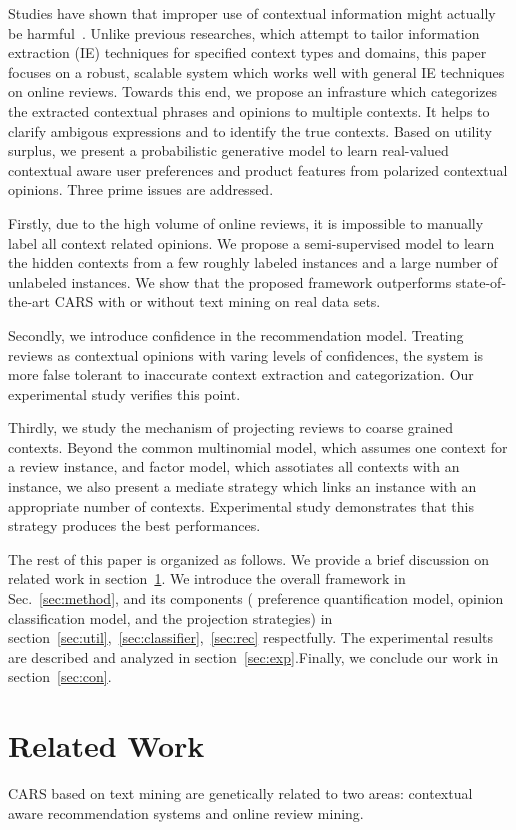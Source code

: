\documentclass[preprint,12pt]{elsarticle}
\begin{document}
Studies have shown that improper use of contextual information might actually be harmful~\cite{Li2010Contextual}. Unlike previous researches, which attempt to tailor information extraction (IE) techniques for specified context types and domains, this paper focuses on a robust, scalable system which works well with general IE techniques on online reviews. Towards this end, we propose an infrasture which categorizes the extracted contextual phrases and opinions to multiple contexts. It helps to clarify ambigous expressions and to identify the true contexts. Based on utility surplus, we present a probabilistic generative model to learn real-valued contextual aware user preferences and product features from polarized contextual opinions. Three prime issues are addressed. 

Firstly, due to the high volume of online reviews, it is impossible to manually label all context related opinions. We propose a semi-supervised model to learn the hidden contexts from a few roughly labeled instances and a large number of unlabeled instances. We show that the proposed framework outperforms state-of-the-art CARS with or without text mining on real data sets.    

Secondly, we introduce confidence in the recommendation model. Treating reviews as contextual opinions with varing levels of confidences, the system is more false tolerant to inaccurate context extraction and categorization. Our experimental study verifies this point.


Thirdly, we study the mechanism of projecting reviews to coarse grained contexts. Beyond the common multinomial model, which assumes one context for a review instance, and factor model, which assotiates all contexts with an instance, we also present a mediate strategy which links an instance with an appropriate number of contexts. Experimental study demonstrates that this strategy produces the best performances.


The rest of this paper is organized as follows.  We provide a brief discussion on related work in section~\ref{sec:related}. We introduce the overall framework in Sec.~\ref{sec:method}, and its components ( preference quantification model, opinion classification model, and the projection strategies) in section~\ref{sec:util},~\ref{sec:classifier},~\ref{sec:rec} respectfully. The experimental results are described and analyzed in section~\ref{sec:exp}.Finally, we conclude our work in section~\ref{sec:con}.

\section{Related Work}\label{sec:related}
%
CARS based on text mining are genetically related to two areas: contextual aware recommendation systems and online review mining.
\end{document}
